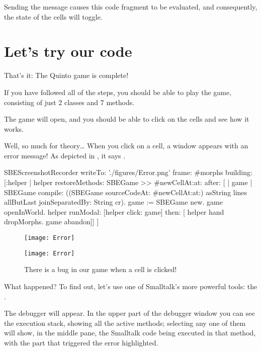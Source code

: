 \documentclass[a4paper,10pt,twoside]{book}
\begin{document}

\noindent
Sending the  message causes this code fragment to be evaluated, and consequently, the state of the cells will toggle.

\section{Let's try our code}

That's it:
The Quinto game is complete!

If you have followed all of the steps, you should be able to play the game, consisting of just 2 classes and 7 methods.


The game will open, and you should be able to click on the cells and see how it works.

Well, so much for theory\ldots{}
When you click on a cell, a  window appears with an error message!
As depicted in , it says .

\begin{ExecuteSmalltalkScript}
SBEScreenshotRecorder writeTo: './figures/Error.png' frame: #morphs building: [:helper |
	helper restoreMethods: {SBEGame >> #newCellAt:at:} after: [
		| game |
		SBEGame compile: ((SBEGame sourceCodeAt: #newCellAt:at:) asString
			lines allButLast joinSeparatedBy: String cr).
		game := SBEGame new.
		game openInWorld.
		helper
			runModal: [helper click: game]
			then: [
				helper hand dropMorphs.
				game abandon]]
]
\end{ExecuteSmalltalkScript}
\begin{figure}[ht]
\ifluluelse
	{\centerline{\texttt{[image: Error]}}}
	{\centerline{\texttt{[image: Error]}}}
\caption{There is a bug in our game when a cell is clicked!
\label{fig:quintoError}}
\end{figure}

\noindent
What happened?
To find out, let's use one of Smalltalk's more powerful tools: the .

The debugger will appear.
In the upper part of the debugger window you can see the execution stack, showing all the active methods; selecting any one of them will show, in the middle pane, the Smalltalk code being executed in that method, with the part that triggered the error highlighted.
\end{document}
